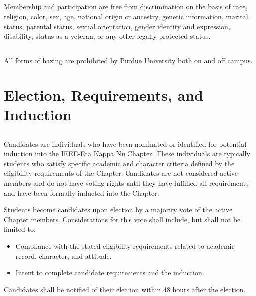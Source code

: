 \documentclass[10pt, oneside]{article}
\begin{document}
\subsection{}
Membership and participation are free from discrimination on the basis of race, religion, color, sex, age, national origin or ancestry, genetic information, marital status, parental status, sexual orientation, gender identity and expression, disability, status as a veteran, or any other legally protected status.

\subsection{}
All forms of hazing are prohibited by Purdue University both on and off campus. 


\section{Election, Requirements, and Induction}
\subsection{}
Candidates are individuals who have been nominated or identified for potential induction into the IEEE-Eta Kappa Nu Chapter. These individuals are typically students who satisfy specific academic and character criteria defined by the eligibility requirements of the Chapter. Candidates are not considered active members and do not have voting rights until they have fulfilled all requirements and have been formally inducted into the Chapter.

Students become candidates upon election by a majority vote of the active Chapter members. Considerations for this vote shall include, but shall not be limited to:

\begin{itemize}
    \item Compliance with the stated eligibility requirements related to academic record, character, and attitude.
    \item Intent to complete candidate requirements and the induction.
\end{itemize}

Candidates shall be notified of their election within 48 hours after the election.

\end{document}
